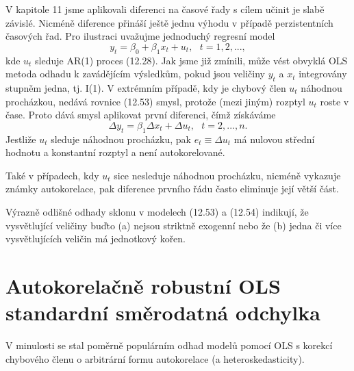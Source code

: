 V kapitole 11 jsme aplikovali diferenci na časové řady s cílem učinit je slabě závislé. Nicméně diference přináší ještě jednu výhodu v případě perzistentních časových řad. Pro ilustraci uvažujme jednoduchý regresní model
\begin{equation}
y_t = \beta_0 + \beta_1 x_t + u_t, ~~~ t = 1, 2, ...,
\end{equation}
kde $u_t$ sleduje AR(1) proces (12.28). Jak jsme již zmínili, může vést obvyklá OLS metoda odhadu k zavádějícím výsledkům, pokud jsou veličiny $y_t$ a $x_t$ integrovány stupněm jedna, tj. I(1). V extrémním případě, kdy je chybový člen $u_t$ náhodnou procházkou, nedává rovnice (12.53) smysl, protože (mezi jiným) rozptyl $u_t$ roste v čase. Proto dává smysl aplikovat první diferenci, čímž získáváme
\begin{equation}
\Delta y_t = \beta_1 \Delta x_t + \Delta u_t, ~~~ t = 2, ..., n.
\end{equation}
Jestliže $u_t$ sleduje náhodnou procházku, pak $e_t \equiv \Delta u_t$ má nulovou střední hodnotu a konstantní rozptyl a není autokorelované.

Také v případech, kdy $u_t$ sice nesleduje náhodnou procházku, nicméně vykazuje známky autokorelace, pak diference prvního řádu často eliminuje její větší část.

Výrazně odlišné odhady sklonu v modelech (12.53) a (12.54) indikují, že vysvětlující veličiny buďto (a) nejsou striktně exogenní nebo že (b) jedna či více vysvětlujících veličin má jednotkový kořen.

\section{Autokorelačně robustní OLS standardní směrodatná odchylka}

V minulosti se stal poměrně populárním odhad modelů pomocí OLS s korekcí chybového členu o arbitrární formu autokorelace (a heteroskedasticity).

